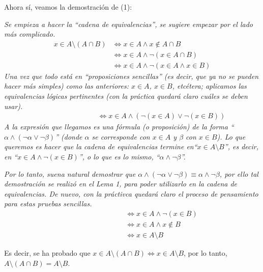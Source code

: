 \documentclass[letterpaper,DIV=12,headsepline,12pt]{scrartcl}
\makeatletter
\renewenvironment{proof}[1][]{%
        \par\pushQED{\qed}%
        \normalfont\topsep6pt \partopsep0pt %
        \trivlist
        \item[\hskip\labelsep
                \textbf{\textit{Demostración.}}%
        ]#1
        }{%
        \popQED\endtrivlist\@endpefalse
    }
\makeatother
\begin{document}
    Ahora sí, veamos la demostración de (1):

    \begin{proof}
        \textcolor{black!67}{\itshape Se empieza a hacer la ``cadena de equivalencias'', se sugiere empezar por el lado \textit{más complicado}.}
        \begin{align*}
            x \in A \setminus (A \cap B) & \Leftrightarrow x \in A \land x \notin A \cap B \tag*{Def. de \( \setminus \)} \\
            & \Leftrightarrow x \in A \land \lnot (x \in A \cap B) \tag*{Def. de \( \notin \)} \\
            & \Leftrightarrow x \in A \land \lnot(x \in A \land x \in B) \tag*{Def. de \( \cap \)}
        \end{align*}
        \textcolor{black!67}{\itshape Una vez que todo está en ``proposiciones sencillas'' (es decir, que ya no se pueden hacer más simples) como las anteriores: \(x \in A\), \(x \in B\), etcétera; aplicamos las equivalencias lógicas pertinentes (con la práctica quedará claro cuáles se deben usar).}
        \begin{align*}
            \phantom{x \in A \setminus (A \cap B)} & \Leftrightarrow x \in A \land (\lnot(x \in A) \lor \lnot(x \in B)) \tag*{Leyes de De Morgan}            
        \end{align*}
        \textcolor{black!67}{\itshape A la expresión que llegamos es una fórmula (o proposición) de la forma ``\(\alpha \land (\lnot \alpha \lor \lnot \beta) \)'' (donde \(\alpha\) se corresponde con \(x \in A\) y \(\beta\) con \(x \in B\)). Lo que queremos es hacer que la cadena de equivalencias termine en``\(x \in A \setminus B\)'', es decir, en ``\(x \in A \land \lnot(x \in B)\)'', o lo que es lo mismo, ``\(\alpha \land \lnot \beta\)''.}
        
        \textcolor{black!67}{\itshape Por lo tanto, suena natural demostrar que \(\alpha \land (\lnot \alpha \lor \lnot \beta) \equiv \alpha \land \lnot \beta\), por ello tal demostración se realizó en el Lema 1, para poder utilizarlo en la cadena de equivalencias. De nuevo, con la práctivca quedará claro el proceso de pensamiento para estas pruebas sencillas.}
        \begin{align*}
            \phantom{x \in A \setminus (A \cap B)} & \Leftrightarrow x \in A \land \lnot(x \in B) \tag*{Por el Lema 1} \\
            & \Leftrightarrow x \in A \land x \notin B \tag*{Def. de \( \notin \)} \\
            & \Leftrightarrow x \in A \setminus B \tag*{Def. de \( \setminus \)}
        \end{align*}

        Es decir, se ha probado que \(x \in A \setminus (A \cap B) \Leftrightarrow x \in A \setminus B\), por lo tanto, $A \setminus (A \cap B) = A \setminus B$.
    \end{proof}
\end{document}
